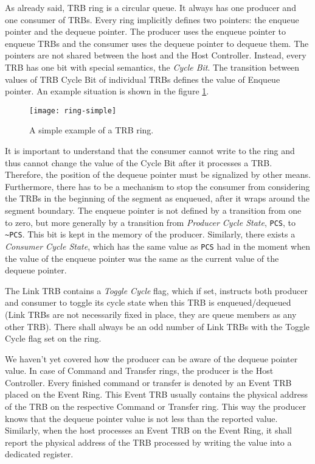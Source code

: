 As already said, TRB ring is a circular queue. It always has one producer and
one consumer of TRBs. Every ring implicitly defines two pointers: the enqueue
pointer and the dequeue pointer. The producer uses the enqueue pointer to
enqueue TRBs and the consumer uses the dequeue pointer to dequeue them. The
pointers are not shared between the host and the Host Controller. Instead,
every TRB has one bit with special semantics, the \emph{Cycle Bit}. The
transition between values of TRB Cycle Bit of individual TRBs defines the
value of Enqueue pointer. An example situation is shown in the figure
\ref{fig:ring-simple}.

\begin{figure}[h]
	\centering
	\texttt{[image: ring-simple]}
	\caption{A simple example of a TRB ring.}
	\label{fig:ring-simple}
\end{figure}

It is important to understand that the consumer cannot write to the ring and
thus cannot change the value of the Cycle Bit after it processes a TRB.
Therefore, the position of the dequeue pointer must be signalized by other
means. Furthermore, there has to be a mechanism to stop the consumer from
considering the TRBs in the beginning of the segment as enqueued, after it
wraps around the segment boundary. The enqueue pointer is not defined by
a transition from one to zero, but more generally by a transition from
\emph{Producer Cycle State}, \texttt{PCS}, to \texttt{\textasciitilde PCS}.
This bit is kept in the memory of the producer. Similarly, there exists
a \emph{Consumer Cycle State}, which has the same value as \texttt{PCS} had in
the moment when the value of the enqueue pointer was the same as the current
value of the dequeue pointer.

The Link TRB contains a \emph{Toggle Cycle} flag, which if set, instructs both
producer and consumer to toggle its cycle state when this TRB is
enqueued/dequeued (Link TRBs are not necessarily fixed in place, they are queue
members as any other TRB). There shall always be an odd number of Link TRBs
with the Toggle Cycle flag set on the ring.

We haven't yet covered how the producer can be aware of the dequeue pointer
value. In case of Command and Transfer rings, the producer is the Host
Controller. Every finished command or transfer is denoted by an Event TRB
placed on the Event Ring. This Event TRB usually contains the physical address
of the TRB on the respective Command or Transfer ring. This way the producer
knows that the dequeue pointer value is not less than the reported value.
Similarly, when the host processes an Event TRB on the Event Ring, it shall
report the physical address of the TRB processed by writing the value into
a dedicated register.

